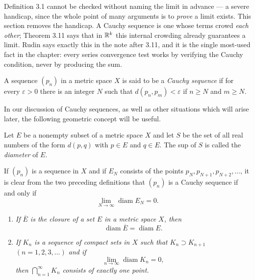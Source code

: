 
\begin{signpost}
Definition 3.1 cannot be checked without naming the limit in advance --- a
severe handicap, since the whole point of many arguments is to \emph{prove} a
limit exists. This section removes the handicap. A Cauchy sequence is one whose
terms crowd \emph{each other}; Theorem 3.11 says that in $\mathbb{R}^k$ this internal
crowding already guarantees a limit. Rudin says exactly this in the note after
3.11, and it is the single most-used fact in the chapter: every series
convergence test works by verifying the Cauchy condition, never by producing
the sum.
\end{signpost}

A sequence $(p_n)$ in a metric space $X$ is said to be a \emph{Cauchy sequence}
if for every $\varepsilon > 0$ there is an integer $N$ such that
$d(p_n,p_m) < \varepsilon$ if $n \ge N$ and $m \ge N$.

In our discussion of Cauchy sequences, as well as other situations which will
arise later, the following geometric concept will be useful.

Let $E$ be a nonempty subset of a metric space $X$ and let $S$ be the set of
all real numbers of the form $d(p,q)$ with $p \in E$ and $q \in E$. The sup of
$S$ is called the \emph{diameter} of $E$.

If $(p_n)$ is a sequence in $X$ and if $E_N$ consists of the points
$p_N, p_{N+1}, p_{N+2}, \dots$, it is clear from the two preceding definitions
that $(p_n)$ is a Cauchy sequence if and only if
\[ \lim_{N\to\infty} \operatorname{diam} E_N = 0. \]

\begin{enumerate}[label=(\alph*), leftmargin=2.2em, itemsep=2pt, topsep=3pt]
  \item \emph{If $\overline{E}$ is the closure of a set $E$ in a metric space
        $X$, then}
        \[ \operatorname{diam} \overline{E} = \operatorname{diam} E. \]
  \item \emph{If $K_n$ is a sequence of compact sets in $X$ such that
        $K_n \supset K_{n+1}$ $(n = 1,2,3,\dots)$ and if}
        \[ \lim_{n\to\infty} \operatorname{diam} K_n = 0, \]
        \emph{then $\bigcap_{n=1}^\infty K_n$ consists of exactly one point.}
\end{enumerate}

